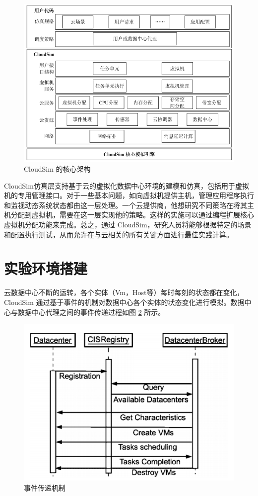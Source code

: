 \begin{figure}[htb]
  \centering
  \includegraphics{./Figure/IMG_Chap4_1.png}
  \caption{CloudSim 的核心架构}\label{Fig:chap4_1}
\end{figure}

 CloudSim仿真层支持基于云的虚拟化数据中心环境的建模和仿真，包括用于虚拟机的专用管理接口。对于一些基本问题，如向虚拟机提供主机，管理应用程序执行和监视动态系统状态都由这一层处理。一个云提供商，他想研究不同策略在将其主机分配到虚拟机，需要在这一层实现他的策略。这样的实施可以通过编程扩展核心虚拟机分配功能来完成。总之，通过 CloudSim，研究人员将能够根据特定的场景和配置执行测试，从而允许在与云相关的所有关键方面进行最佳实践计算。

 \section{实验环境搭建}
云数据中心不断的运转，各个实体（Vm，Host等）每时每刻的状态都在变化，CloudSim 通过基于事件的机制对数据中心各个实体的状态变化进行模拟。数据中心与数据中心代理之间的事件传递过程如图 \ref{Fig:chap4_2} 所示。

\begin{figure}[htb]
  \centering
  \includegraphics{./Figure/IMG_Chap4_2.png}
  \caption{事件传递机制}\label{Fig:chap4_2}
\end{figure}

